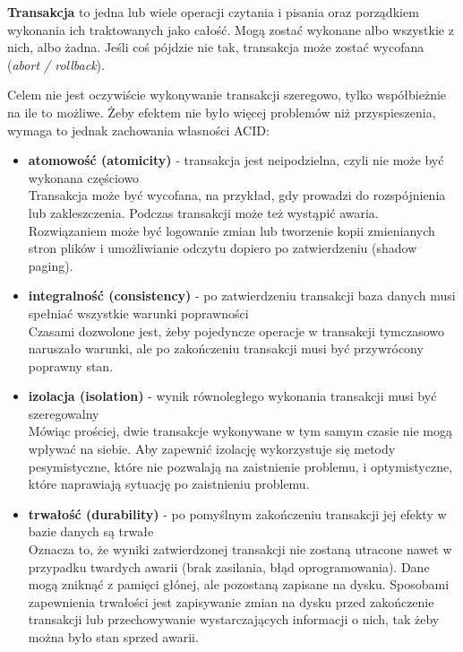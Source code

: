 \textbf{Transakcja} to jedna lub wiele operacji czytania i pisania oraz porządkiem wykonania ich traktowanych jako całość.
Mogą zostać wykonane albo wszystkie z nich, albo żadna. Jeśli coś pójdzie nie tak, transakcja może zostać wycofana (\textit{abort / rollback}).

Celem nie jest oczywiście wykonywanie transakcji szeregowo, tylko współbieżnie na ile to możliwe. Żeby efektem nie było więcej problemów niż przyspieszenia, wymaga to jednak zachowania własności ACID:
\begin{itemize}
    \item \textbf{atomowość (atomicity)} - transakcja jest neipodzielna, czyli nie może być wykonana częściowo \\
    Transakcja może być wycofana, na przykład, gdy prowadzi do rozspójnienia lub zakleszczenia. Podczas transakcji może też wystąpić awaria.
    Rozwiązaniem może być logowanie zmian lub tworzenie kopii zmienianych stron plików i umożliwianie odczytu dopiero po zatwierdzeniu (shadow paging).
    
    \item \textbf{integralność (consistency)} - po zatwierdzeniu transakcji baza danych musi spełniać wszystkie warunki poprawności \\
    Czasami dozwolone jest, żeby pojedyncze operacje w transakcji tymczasowo naruszało warunki, ale po zakończeniu transakcji musi być przywrócony poprawny stan.
    
    \item \textbf{izolacja (isolation)} - wynik równoległego wykonania transakcji musi być szeregowalny \\
    Mówiąc prościej, dwie transakcje wykonywane w tym samym czasie nie mogą wpływać na siebie.
    Aby zapewnić izolację wykorzystuje się metody pesymistyczne, które nie pozwalają na zaistnienie problemu, i optymistyczne, które naprawiają sytuację po zaistnieniu problemu.
    
    \item \textbf{trwałość (durability)} - po pomyślnym zakończeniu transakcji jej efekty w bazie danych są trwałe \\
    Oznacza to, że wyniki zatwierdzonej transakcji nie zostaną utracone nawet w przypadku twardych awarii (brak zasilania, błąd oprogramowania).
    Dane mogą zniknąć z pamięci głónej, ale pozostaną zapisane na dysku. Sposobami zapewnienia trwałości jest zapisywanie zmian na dysku przed zakończenie transakcji  lub przechowywanie wystarczających informacji o nich, tak żeby można było stan sprzed awarii.
\end{itemize}